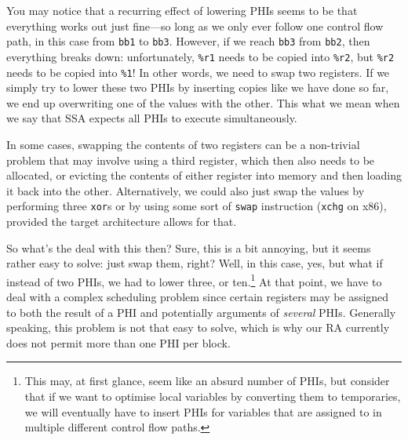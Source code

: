 \documentclass[12pt]{report}
\begin{document}
\noindent You may notice that a recurring effect of lowering PHIs seems to be that everything works out just fine—so long as we only ever
follow one control flow path, in this case from \verb|bb1| to \verb|bb3|. However, if we reach \verb|bb3| from \verb|bb2|, then everything 
breaks down: unfortunately, \verb|%r1| needs to be copied into \verb|%r2|, but \verb|%r2| needs to be copied into \verb|%1|! In 
other words, we need to swap two registers. If we simply try to lower these two PHIs by inserting copies like we have done so far, we end
up overwriting one of the values with the other. This what we mean when we say that SSA expects all PHIs to execute simultaneously.

In some cases, swapping the contents of two registers can be a non-trivial problem that may involve using a third register, which then also
needs to be allocated, or evicting the contents of either register into memory and then loading it back into the other. Alternatively, we
could also just swap the values by performing three \verb|xor|s or by using some sort of \verb|swap| instruction (\verb|xchg| on 
x86), provided the target architecture allows for that.

So what's the deal with this then? Sure, this is a bit annoying, but it seems rather easy to solve: just swap them, right? Well, in this
case, yes, but what if instead of two PHIs, we had to lower three, or ten.\footnote{This may, at first glance, seem like an absurd number of
PHIs, but consider that if we want to optimise local variables by converting them to temporaries, we will eventually have to insert PHIs for
variables that are assigned to in multiple different control flow paths.} At that point, we have to deal with a complex scheduling 
problem since certain registers may be assigned to both the result of a PHI and potentially arguments of \textit{several} PHIs. Generally
speaking, this problem is not that easy to solve, which is why our RA currently does not permit more than one PHI per block.
\end{document}
